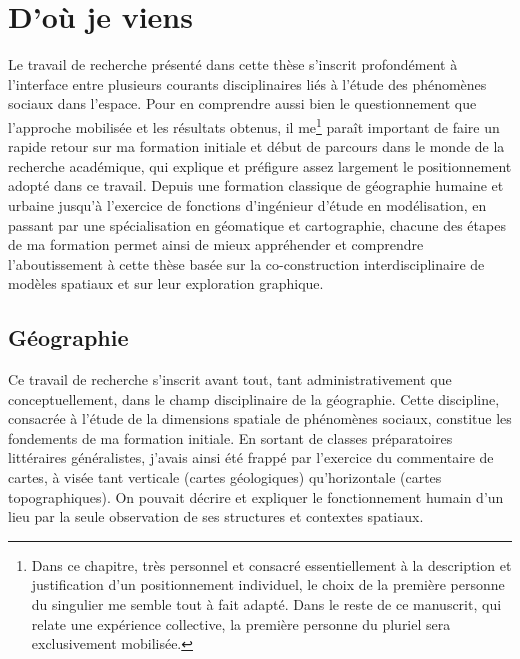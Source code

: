 \section{D'où je viens}

Le travail de recherche présenté dans cette thèse s'inscrit profondément à l'interface entre plusieurs courants disciplinaires liés à l'étude des phénomènes sociaux dans l'espace.
Pour en comprendre aussi bien le questionnement que l'approche mobilisée et les résultats obtenus, il me\footnote{
	Dans ce chapitre, très personnel et consacré essentiellement à la description et justification d'un positionnement individuel, le choix de la première personne du singulier me semble tout à fait adapté.
	Dans le reste de ce manuscrit, qui relate une expérience collective, la première personne du pluriel sera exclusivement mobilisée.
} paraît important de faire un rapide retour sur ma formation initiale et début de parcours dans le monde de la recherche académique, qui explique et préfigure assez largement le positionnement adopté dans ce travail.
Depuis une formation classique de géographie humaine et urbaine jusqu'à l'exercice de fonctions d'ingénieur d'étude en modélisation, en passant par une spécialisation en géomatique et cartographie, chacune des étapes de ma formation permet ainsi de mieux appréhender et comprendre l'aboutissement à cette thèse basée sur la co-construction interdisciplinaire de modèles spatiaux et sur leur exploration graphique.

\subsection{Géographie}

Ce travail de recherche s'inscrit avant tout, tant administrativement que conceptuellement, dans le champ disciplinaire de la géographie.
Cette discipline, consacrée à l'étude de la dimensions spatiale de phénomènes sociaux, constitue les fondements de ma formation initiale.
En sortant de classes préparatoires littéraires généralistes, j'avais ainsi été frappé par l'exercice du commentaire de cartes, à visée tant verticale (cartes géologiques) qu'horizontale (cartes topographiques).
On pouvait décrire et expliquer le fonctionnement humain d'un lieu par la seule observation de ses structures et contextes spatiaux.

